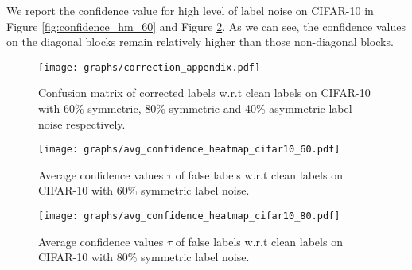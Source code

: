 \documentclass{article}
\begin{document}
We report the confidence value for high level of label noise on CIFAR-10 in Figure \ref{fig:confidence_hm_60} and Figure \ref{fig:confidence_hm_80}. As we can see, the confidence values on the diagonal blocks remain relatively higher than those non-diagonal blocks.

\begin{table*}[htb!]
	\begin{center}
	\end{center}
	\caption{Correction accuracy (\%) on CIFAR-10 and CIFAR-100 with various levels of label noise injected to training set.}
	\label{table:correct_acc}
\end{table*}

\begin{figure}[t]
	\begin{center}
		\texttt{[image: graphs/correction\_appendix.pdf]}
	\end{center}
	\caption{Confusion matrix of corrected labels w.r.t clean labels on CIFAR-10 with 60\% symmetric, 80\% symmetric and 40\% asymmetric label noise respectively.}
	\label{fig:more_confumatrix}
\end{figure}

\begin{figure}[t]
	\centering
	\begin{minipage}[t]{0.45\textwidth}
		\centering
		\texttt{[image: graphs/avg\_confidence\_heatmap\_cifar10\_60.pdf]}
		\caption{Average confidence values $\tau$ of false labels w.r.t clean labels on CIFAR-10 with 60\% symmetric label noise.}
		\label{fig:confidence_hm_60}
	\end{minipage}
	\hspace{0.5cm}
	\begin{minipage}[t]{0.45\textwidth}	
		\centering
		\texttt{[image: graphs/avg\_confidence\_heatmap\_cifar10\_80.pdf]}
		\caption{Average confidence values $\tau$ of false labels w.r.t clean labels on CIFAR-10 with 80\% symmetric label noise.}
		\label{fig:confidence_hm_80}
	\end{minipage}
	\vspace{-0.9em}
\end{figure}
\end{document}
